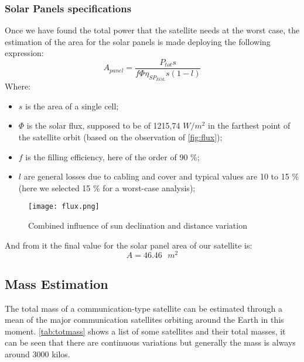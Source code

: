 \subsubsection{Solar Panels specifications}
	Once we have found the total power that the satellite needs at the worst case, the estimation of the area for the solar panels is made deploying the following expression:
\begin{equation}
A_{panel} = \frac{P_{tot} s}{f \Phi \eta_{SP_{EOL}} s (1 - l)}
\end{equation}
Where:
\begin{itemize}
\item $s$ is the area of a single cell;
\item $\Phi$ is the solar flux, supposed to be of 1215,74 $W/m^2$ in the farthest point of the satellite orbit (based on the observation of \autoref{fig:flux});
\item $f$ is the filling efficiency, here of the order of 90 \%;
\item $l$ are general losses due to cabling and cover and typical values are 10 to 15 \% (here we selected 15 \% for a worst-case analysis);
\end{itemize}
\begin{figure}[h]
\centering
\texttt{[image: flux.png]}
\caption{Combined influence of sun declination and distance variation}
\label{fig:flux}
\end{figure}
And from it the final value for the solar panel area of our satellite is:
\begin{equation}
A = 46.46 \text{ $m^2$}
\end{equation}
\subsection{Mass Estimation}
	The total mass of a communication-type satellite can be estimated through a mean of the major communication satellites orbiting around the Earth in this moment. \autoref{tab:totmass} shows a list of some satellites and their total masses, it can be seen that there are continuous variations but generally the mass is always around 3000 kilos.


